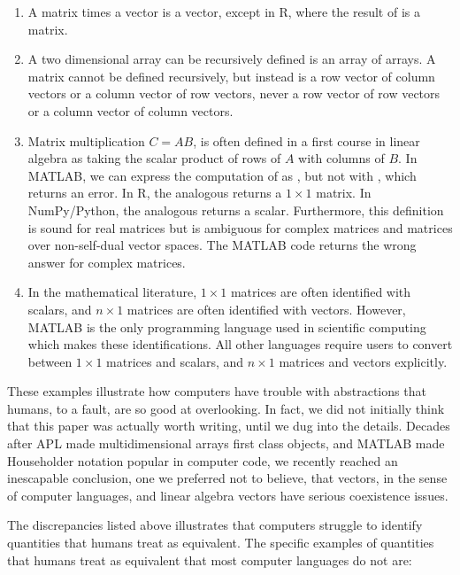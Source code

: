 \begin{enumerate}
\item
A matrix times a vector is a vector, except in R, where the result of  is a matrix.

\item
A two dimensional array can be recursively defined is an array of arrays. A matrix cannot be defined recursively, but instead is a row vector of column vectors or a column vector of row vectors, never a row vector of row vectors or a column vector of column vectors.

\item
Matrix multiplication $C=AB$, is often defined in a first course in linear algebra as taking the scalar product of rows of $A$ with columns of $B$.
In MATLAB, we can express the computation of  as , but not with , which returns an error.
In R, the analogous  returns a $1\times1$ matrix.
In NumPy/Python, the analogous  returns a scalar.
Furthermore, this definition is sound for real matrices but is ambiguous for complex matrices and matrices over non-self-dual vector spaces.
The MATLAB code  returns the wrong answer for complex matrices.

\item
In the mathematical literature, $1\times 1$ matrices are often identified with scalars, and $n\times 1$ matrices are often identified with vectors. However, MATLAB is the only programming language used in scientific computing which makes these identifications. All other languages require users to convert between $1\times 1$ matrices and scalars, and $n\times 1$ matrices and vectors explicitly.

\end{enumerate}


These examples illustrate how computers have trouble with abstractions that humans, to a fault, are so good at overlooking. In fact, we did not initially think that this paper was actually worth writing, until we dug into the details. Decades after APL made multidimensional arrays first class objects, and MATLAB made Householder notation popular in computer code, we recently reached an inescapable conclusion, one we preferred not to believe, that vectors, in the sense of computer languages, and linear algebra vectors have serious coexistence issues.

The discrepancies listed above illustrates that computers struggle to identify quantities that humans treat as equivalent. The specific examples of quantities that humans treat as equivalent that most computer languages do not are:

